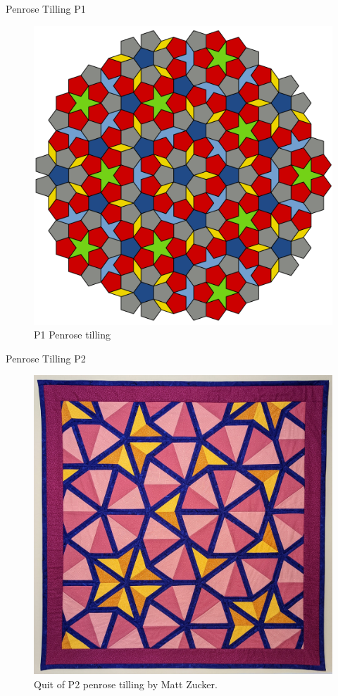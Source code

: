 \documentclass{beamer}
\begin{document}
\begin{frame}{Penrose Tilling P1}
    \begin{figure}
        \centering
        \includegraphics[width=0.5\linewidth]{images/penrose/Penrose_Tiling_(P1).svg.png}
        \caption{P1 Penrose tilling \cite{penrose_tiling_p1}}
        \label{fig:penrose-p1}
    \end{figure}
\end{frame}

\begin{frame}{Penrose Tilling P2}
    \begin{figure}
        \centering
        \includegraphics[width=0.5\linewidth]{images/penrose/pquilt_final.jpg}
        \caption{Quit of P2 penrose tilling by Matt Zucker.\cite{zucker2022penrosequilt}}
        \label{fig:penrose-p2}
    \end{figure}
\end{frame}
\end{document}
